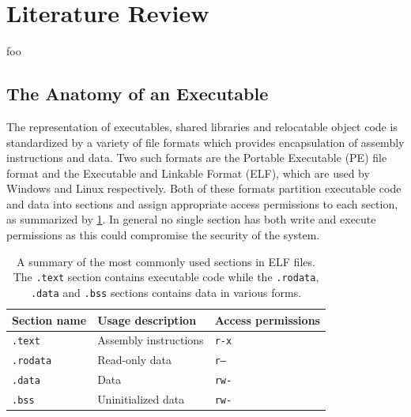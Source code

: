 
\section{Literature Review}

foo


\subsection{The Anatomy of an Executable}
\label{sec:executable_anatomy}

The representation of executables, shared libraries and relocatable object code is standardized by a variety of file formats which provides encapsulation of assembly instructions and data. Two such formats are the Portable Executable (PE) file format and the Executable and Linkable Format (ELF), which are used by Windows and Linux respectively. Both of these formats partition executable code and data into sections and assign appropriate access permissions to each section, as summarized by \cref{tbl:elf_sections}. In general no single section has both write and execute permissions as this could compromise the security of the system.

\begin{table}[htbp]
	\begin{center}
		\begin{tabular}{|l|l|l|}
			\hline
			Section name & Usage description & Access permissions \\
			\hline
			\texttt{.text} & Assembly instructions & \texttt{r-x} \\
			\texttt{.rodata} & Read-only data & \texttt{r--} \\
			\texttt{.data} & Data & \texttt{rw-} \\
			\texttt{.bss} & Uninitialized data & \texttt{rw-} \\
			\hline
		\end{tabular}
	\end{center}
	\caption{A summary of the most commonly used sections in ELF files. The \texttt{.text} section contains executable code while the \texttt{.rodata}, \texttt{.data} and \texttt{.bss} sections contains data in various forms.}
	\label{tbl:elf_sections}
\end{table}

